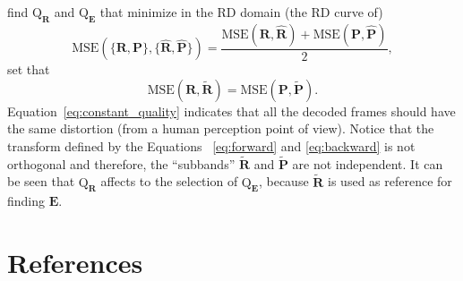 find $\text{Q}_{\mathbf{R}}$ and $\text{Q}_{\mathbf{E}}$ that minimize in the RD domain (the RD curve of)
\begin{equation}
  \text{MSE}(\{\mathbf{R},\mathbf{P}\},\{\hat{\mathbf{R}},\hat{\mathbf{P}}\}) = \frac{\text{MSE}({\mathbf R},\hat{\mathbf R}) + \text{MSE}({\mathbf P},\hat{\mathbf P})}{2},
\end{equation}
set that
\begin{equation}
  \text{MSE}({\mathbf R},\tilde{\mathbf R}) = \text{MSE}({\mathbf P},\tilde{\mathbf P}).
  \label{eq:constant_quality}
\end{equation}
Equation~\ref{eq:constant_quality} indicates that all the decoded
frames should have the same distortion (from a human perception point
of view). Notice that the transform defined by the Equations
~\ref{eq:forward} and \ref{eq:backward} is not orthogonal and
therefore, the ``subbands'' $\tilde{\mathbf R}$ and
$\tilde{\mathbf P}$ are not independent. It can be seen that
$\text{Q}_{\mathbf R}$ affects to the selection of
$\text{Q}_{\mathbf E}$, because $\tilde{\mathbf R}$ is used as
reference for finding ${\mathbf E}$.


\section{References}

\renewcommand{\addcontentsline}[3]{}%



